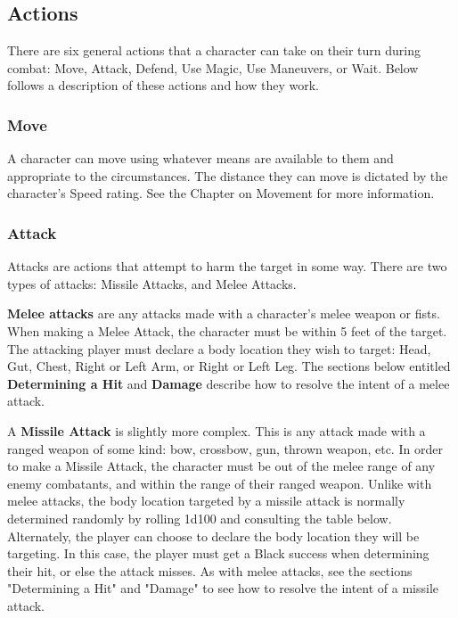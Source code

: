 \documentclass[oneside]{book}
\begin{document}
\begin{multicols}{2}
\section{Actions}
There are six general actions that a character can take on their turn during combat: Move, Attack, Defend, Use Magic, Use Maneuvers, or Wait. Below follows a description of these actions and how they work. 

\subsubsection{Move}
A character can move using whatever means are available to them and appropriate to the circumstances. The distance they can move is dictated by the character's Speed rating. See the Chapter on Movement for more information.

\subsubsection{Attack}
Attacks are actions that attempt to harm the target in some way. There are two types of attacks: Missile Attacks, and Melee Attacks.

\textbf{Melee attacks} are any attacks made with a character's melee weapon or fists. When making a Melee Attack, the character must be within 5 feet of the target. The attacking player must declare a body location they wish to target: Head, Gut, Chest, Right or Left Arm, or Right or Left Leg. The sections below entitled \textbf{Determining a Hit} and \textbf{Damage} describe how to resolve the intent of a melee attack. 

A \textbf{Missile Attack} is slightly more complex. This is any attack made with a ranged weapon of some kind: bow, crossbow, gun, thrown weapon, etc. In order to make a Missile Attack, the character must be  out of the melee range of any enemy combatants, and within the range of their ranged weapon. Unlike with melee attacks, the body location targeted by a missile attack is normally determined randomly by rolling 1d100 and consulting the table below. Alternately, the player can choose to declare the body location they will be targeting. In this case, the player must get a Black success when determining their hit, or else the attack misses. As with melee attacks, see the sections "Determining a Hit" and "Damage" to see how to resolve the intent of a missile attack. 



\end{multicols}
\end{document}
